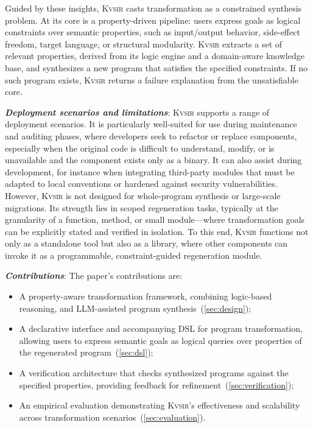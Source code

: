 \documentclass[nonacm,sigplan,review]{acmart}
\newcommand{\sys}{{\scshape Kv{\textalpha}sir}\xspace}
\newcommand{\heading}[1]{\vspace{2pt}\noindent\textbf{\emph{#1}}:\enspace}
\begin{document}
Guided by these insights, \sys casts transformation as a constrained synthesis problem.
At its core is a property-driven pipeline: users express goals as logical constraints over semantic properties, such as input/output behavior, side-effect freedom, target language, or structural modularity.
\sys extracts a set of relevant properties, derived from its logic engine and a domain-aware knowledge base, and synthesizes a new program that satisfies the specified constraints.
If no such program exists, \sys returns a failure explanation from the unsatisfiable core.

\heading{Deployment scenarios and limitations}
\sys supports a range of deployment scenarios.
It is particularly well-suited for use during maintenance and auditing phases, where developers seek to refactor or replace components, especially when the original code is difficult to understand, modify, or is unavailable and the component exists only as a binary.
It can also assist during development, for instance when integrating third-party modules that must be adapted to local conventions or hardened against security vulnerabilities.
However, \sys is not designed for whole-program synthesis or large-scale migrations.
Its strength lies in scoped regeneration tasks, typically at the granularity of a function, method, or small module---where transformation goals can be explicitly stated and verified in isolation.
To this end, \sys functions not only as a standalone tool but also as a
library, where other components can invoke it as a programmable,
constraint-guided regeneration module.


\heading{Contributions}
The paper's contributions are:
\begin{itemize}
  \item A property-aware transformation framework, combining logic-based reasoning, and LLM-assisted program synthesis~(\cref{sec:design});
 \item A declarative interface and accompanying DSL for program transformation, allowing users to express semantic goals as logical queries over properties of the regenerated program~(\cref{sec:dsl});
 \item A verification architecture that checks synthesized programs against the specified properties, providing feedback for refinement~(\cref{sec:verification});
 \item An empirical evaluation demonstrating \sys's effectiveness and scalability across transformation scenarios~(\cref{sec:evaluation}).
\end{itemize}
\end{document}
